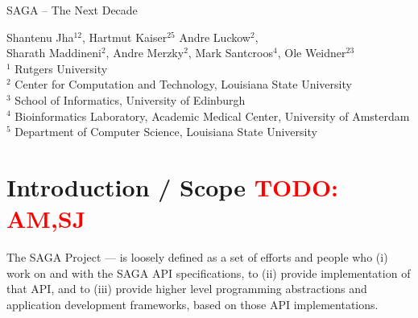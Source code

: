 \documentclass{article}
\newcommand{\B}[1]{\textbf{#1}}
\newcommand{\todo}[1]{{\textcolor{red}{\B{TODO:} #1 }}}
\begin{document}
\begin{center}
 {\Large SAGA -- The Next Decade}
\end{center}

{
 {
  \centering
  Shantenu Jha$^{12}$,
  Hartmut Kaiser$^{25}$
  Andre Luckow$^{2}$,\\
  Sharath Maddineni$^{2}$,
  Andre Merzky$^{2}$,
  Mark Santcroos$^{4}$,
  Ole Weidner$^{23}$
  \\[0.4em]
  }
 \noindent
 \tiny
 $^1$ Rutgers University\\[-1.0em]
 $^2$ Center for Computation and Technology, Louisiana State University\\[-1.0em]
 $^3$ School of Informatics, University of Edinburgh \\[-1.0em]
 $^4$ Bioinformatics Laboratory, Academic Medical Center, University of Amsterdam\\[-1.0em]
 $^5$ Department of Computer Science, Louisiana State University\\[-1.0em]
}

\begin{abstract}

  
  The SAGA Project (as described below) has grown over time and
  evolved with the ``infrastructure''. In this paper, we provide a
  retrospective -- an analysis of how where we are with respect to how
  and where would be, as well as a forward looking evolution and
  growth trajectory.  This paper is a summary of that process, and of
  our consolidation as a project.



\end{abstract}


\section{Introduction / Scope \todo{AM,SJ}}
\label{sec:intro}

 
The SAGA Project --- is loosely defined as a set of
efforts and people who (i) work on and with the SAGA API
specifications, to (ii) provide implementation of that API, and to
(iii) provide higher level programming abstractions and application
development frameworks, based on those API implementations.  
\end{document}
